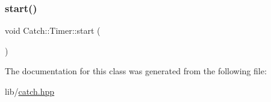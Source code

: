 \hypertarget{class_catch_1_1_timer_a0a56e879e43f36c102bf9ea8b5fc8b72}{}\label{class_catch_1_1_timer_a0a56e879e43f36c102bf9ea8b5fc8b72} 
\subsubsection{\texorpdfstring{start()}{start()}}
{\footnotesize\ttfamily void Catch\+::\+Timer\+::start (\begin{DoxyParamCaption}{ }\end{DoxyParamCaption})}



The documentation for this class was generated from the following file\+:\begin{DoxyCompactItemize}
\item 
lib/\hyperlink{catch_8hpp}{catch.\+hpp}\end{DoxyCompactItemize}
